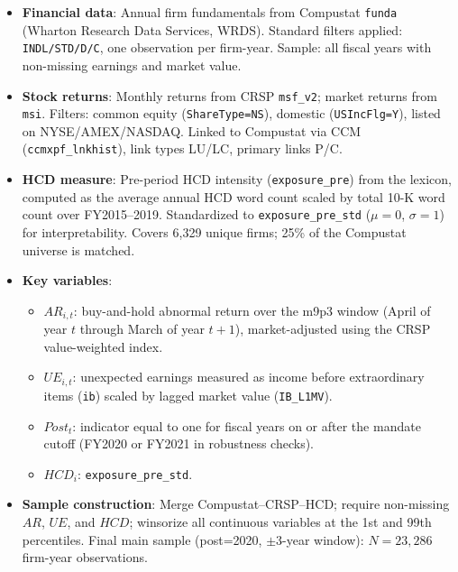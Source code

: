 \documentclass[12pt,english]{article}
\begin{document}
\begin{itemize}
    \item \textbf{Financial data}: Annual firm fundamentals from Compustat
          \texttt{funda} (Wharton Research Data Services, WRDS). Standard
          filters applied: \texttt{INDL/STD/D/C}, one observation per
          firm-year. Sample: all fiscal years with non-missing earnings and
          market value.
    \item \textbf{Stock returns}: Monthly returns from CRSP \texttt{msf\_v2};
          market returns from \texttt{msi}. Filters: common equity
          (\texttt{ShareType=NS}), domestic (\texttt{USIncFlg=Y}), listed on
          NYSE/AMEX/NASDAQ. Linked to Compustat via CCM
          (\texttt{ccmxpf\_lnkhist}), link types LU/LC, primary links P/C.
    \item \textbf{HCD measure}: Pre-period HCD intensity
          (\texttt{exposure\_pre}) from the \citet{demers2024} lexicon,
          computed as the average annual HCD word count scaled by total
          10-K word count over FY2015--2019. Standardized to
          \texttt{exposure\_pre\_std} ($\mu=0$, $\sigma=1$) for
          interpretability. Covers 6,329 unique firms; 25\% of the
          Compustat universe is matched.
    \item \textbf{Key variables}:
          \begin{itemize}
              \item $AR_{i,t}$: buy-and-hold abnormal return over the m9p3
                    window (April of year $t$ through March of year $t+1$),
                    market-adjusted using the CRSP value-weighted index.
              \item $UE_{i,t}$: unexpected earnings measured as income before
                    extraordinary items (\texttt{ib}) scaled by lagged market
                    value (\texttt{IB\_L1MV}).
              \item $Post_t$: indicator equal to one for fiscal years on or
                    after the mandate cutoff (FY2020 or FY2021 in robustness
                    checks).
              \item $HCD_i$: \texttt{exposure\_pre\_std}.
          \end{itemize}
    \item \textbf{Sample construction}: Merge Compustat--CRSP--HCD; require
          non-missing $AR$, $UE$, and $HCD$; winsorize all continuous
          variables at the 1st and 99th percentiles. Final main sample
          (post=2020, $\pm$3-year window): $N=23{,}286$ firm-year
          observations.
\end{itemize}
\end{document}
